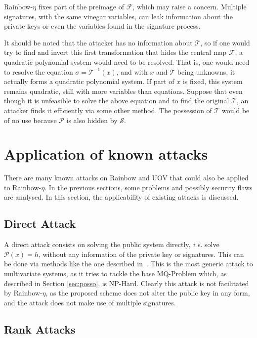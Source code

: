 \documentclass{ufsctex/ufsctex}
\begin{document}
Rainbow-$\eta$ fixes part of the preimage of $\mathcal{F}$, which may raise a
concern. Multiple signatures, with the same vinegar variables, can leak
information about the private keys or even the variables found in the signature
process.

It should be noted that the attacker has no information about $\mathcal{T}$, so
if one would try to find and invert this first transformation that hides the
central map $\mathcal{F}$, a quadratic polynomial system would need to be
resolved. That is, one would need to resolve the equation $\sigma =
\mathcal{T}^{-1}(x)$, and with $x$ and $\mathcal{T}$ being unknowns, it
actually forms a quadratic polynomial system. If part of $x$ is fixed, this
system remains quadratic, still with more variables than equations. Suppose
that even though it is unfeasible to solve the above equation and to find the
original $\mathcal{T}$, an attacker finds it efficiently via some other method.
The possession of $\mathcal{T}$ would be of no use because $\mathcal{P}$ is
also hidden by $\mathcal{S}$.

\section{Application of known attacks}

There are many known attacks on Rainbow and UOV that could also be applied to
Rainbow-$\eta$. In the previous sections, some problems and possibly security
flaws are analysed. In this section, the applicability of existing attacks is
discussed.

\subsection{Direct Attack}

A direct attack consists on solving the public system directly, \textit{i.e.}
solve $\mathcal{P}(x) = h$, without any information of the private key or
signatures. This can be done via methods like the one described
in~\cite{bettale2009hybrid}. This is the most generic attack to multivariate
systems, as it tries to tackle the base MQ-Problem which, as described in
Section \ref{sec:posso}, is NP-Hard. Clearly this attack is not facilitated by
Rainbow-$\eta$, as the proposed scheme does not alter the public key in any
form, and the attack does not make use of multiple signatures.

\subsection{Rank Attacks}
\end{document}
